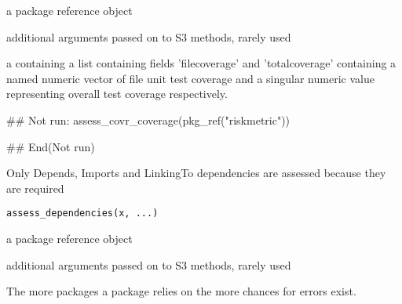 \documentclass[a4paper]{book}
\begin{document}
%
\begin{Arguments}
\begin{ldescription}
\item[\code{x}] a  package reference object

\item[\code{...}] additional arguments passed on to S3 methods, rarely used
\end{ldescription}
\end{Arguments}
%
\begin{Value}
a  containing a list containing fields 'filecoverage' and 'totalcoverage' containing a named numeric vector of file unit test coverage and a singular numeric value representing overall test coverage respectively.
\end{Value}
%
\begin{SeeAlso}
\end{SeeAlso}
%
\begin{Examples}
\begin{ExampleCode}
## Not run: 
assess_covr_coverage(pkg_ref("riskmetric"))

## End(Not run)
\end{ExampleCode}
\end{Examples}
%
\begin{Description}
Only Depends, Imports and LinkingTo dependencies are assessed because
they are required
\end{Description}
%
\begin{Usage}
\begin{verbatim}
assess_dependencies(x, ...)
\end{verbatim}
\end{Usage}
%
\begin{Arguments}
\begin{ldescription}
\item[\code{x}] a  package reference object

\item[\code{...}] additional arguments passed on to S3 methods, rarely used
\end{ldescription}
\end{Arguments}
%
\begin{Details}
The more packages a package relies on the more chances for errors exist.
\end{Details}
\end{document}
